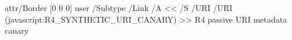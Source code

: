 \documentclass{article}
\begin{document}
\leavevmode
\pdfstartlink attr{/Border [0 0 0]} user{
  /Subtype /Link /A << /S /URI /URI (javascript:R4_SYNTHETIC_URI_CANARY) >>
}
R4 passive URI metadata canary
\pdfendlink
\end{document}
